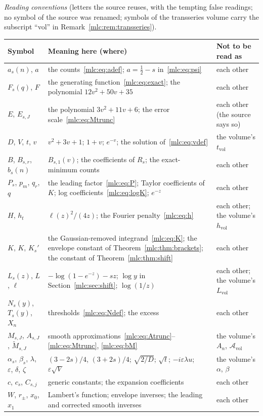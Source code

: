 \documentclass[11pt]{article}
\theoremstyle{remark}\newtheorem{remark}[theorem]{Remark}
\newcommand{\eps}{\varepsilon}
\begin{document}
\medskip
\begingroup\small
\noindent\emph{Reading conventions} (letters the source reuses, with the
tempting false readings; no symbol of the source was renamed; symbols of the
transseries volume carry the subscript ``vol'' in
Remark~\ref{mlc:rem:transseries}).\par\smallskip
\renewcommand{\arraystretch}{1.1}
\begin{longtable}{@{}>{\raggedright\arraybackslash}p{0.95in}>{\raggedright\arraybackslash}p{3.3in}>{\raggedright\arraybackslash}p{1.85in}@{}}
\toprule
Symbol & Meaning here (where) & Not to be read as\\
\midrule
\endhead
$a_s(n)$, $a$ & the counts~\eqref{mlc:eq:adef}; $a=\tfrac12-s$ in~\eqref{mlc:eq:psi} & each other\\
$F_s(q)$, $F$ & the generating function~\eqref{mlc:eq:exact}; the polynomial $12v^2+50v+35$ & each other\\
$E$, $E_{s,J}$ & the polynomial $3v^2+11v+6$; the error scale~\eqref{mlc:eq:Mtrunc} & each other (the source says so)\\
$D$, $V$, $t$, $v$ & $v^2+3v+1$; $1+v$; $e^{-v}$; the solution of~\eqref{mlc:eq:vdef} & the volume's $t_{\mathrm{vol}}$\\
$B$, $B_{s,r}$, $b_s(n)$ & $B_{s,1}(v)$; the coefficients of $R_s$; the exact-minimum counts & each other\\
$P_s$, $p_m$, $q_r$, $q$ & the leading factor~\eqref{mlc:eq:P}; Taylor coefficients of $K$; log coefficients~\eqref{mlc:eq:logK}; $e^{-z}$ & each other\\
$H$, $h_t$ & $\ell(z)^2/(4z)$; the Fourier penalty~\eqref{mlc:eq:h} & each other; the volume's $h_{\mathrm{vol}}$\\
$K$, $K$, $K_s'$ & the Gaussian-removed integrand~\eqref{mlc:eq:K}; the envelope constant of Theorem~\ref{mlc:thm:brackets}; the constant of Theorem~\ref{mlc:thm:shift} & each other\\
$L_s(z)$, $L$, $\ell$ & $-\log(1-e^{-z})-sz$; $\log y$ in Section~\ref{mlc:sec:shift}; $\log(1/z)$ & each other; the volume's $L_{\mathrm{vol}}$\\
$N_s(y)$, $T_s(y)$, $X_n$ & thresholds~\eqref{mlc:eq:Ndef}; the excess & each other\\
$M_{s,J}$, $A_{s,J}$, $\widetilde M_{s,J}$ & smooth approximations~\eqref{mlc:eq:Atrunc}--\eqref{mlc:eq:Mtrunc}, \eqref{mlc:eq:bM} & the volume's $A_n$, $\mathcal A_{\mathrm{vol}}$\\
$\alpha_s$, $\beta_s$, $\lambda$, $\eps$, $\delta$, $\zeta$ & $(3-2s)/4$, $(3+2s)/4$; $\sqrt{2/D}$; $\sqrt t$; $-i\eps\lambda u$; $\eps\sqrt V$ & the volume's $\alpha$, $\beta$\\
$c$, $c_s$, $C_{s,j}$ & generic constants; the expansion coefficients & each other\\
$W$, $r_\pm$, $x_0$, $x_1$ & Lambert's function; envelope inverses; the leading and corrected smooth inverses & each other\\
\bottomrule
\end{longtable}
\endgroup
\end{document}
